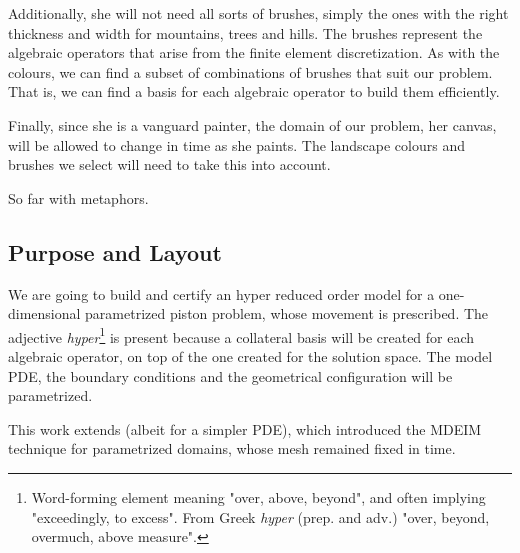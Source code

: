 \documentclass[thesis.tex]{subfiles}
\begin{document}
Additionally, she will not need all sorts of brushes, 
simply the ones with the right thickness and width for mountains, trees and hills.
The brushes represent the algebraic operators that arise from the finite element discretization.
As with the colours, we can find a subset of combinations of brushes that suit our problem.
That is, we can find a basis for each algebraic operator to build them efficiently.

Finally, since she is a vanguard painter, the domain of our problem, her canvas, 
will be allowed to change in time as she paints.
The landscape colours and brushes we select will need to take this into account.

So far with metaphors.

\subsection{Purpose and Layout}
We are going to build and certify an
{hyper reduced order model} 
for a one-dimensional parametrized piston problem, 
whose movement is prescribed.
The adjective \mbox{\textit{hyper}}\footnote{
    Word-forming element meaning "over, above, beyond", 
    and often implying "exceedingly, to excess".
    From Greek \textit{hyper} (prep. and adv.) 
    "over, beyond, overmuch, above measure".
} is present because 
a collateral basis will be created for each algebraic operator,
on top of the one created for the solution space.
The model PDE, the boundary conditions and the geometrical configuration will be parametrized.

This work extends \cite{Santo_Manzoni_2019,2015_efficientModelReductionParametrizedSystemsMatrixDeim_Negri}
(albeit for a simpler PDE), 
which introduced the MDEIM technique for parametrized domains, whose mesh remained fixed in time.
\end{document}
